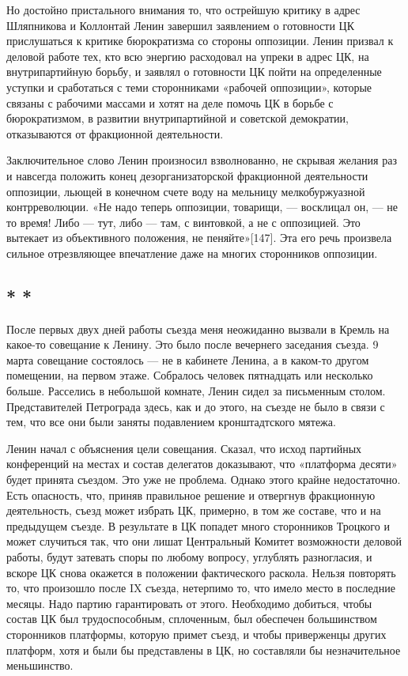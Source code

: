 \documentclass[12pt, a4paper, openany]{book}
\begin{document}
Но достойно пристального внимания то, что острейшую критику в адрес Шляпникова и Коллонтай Ленин завершил заявлением о готовности ЦК прислушаться к критике бюрократизма со стороны оппозиции. Ленин призвал к деловой работе тех, кто всю энергию расходовал на упреки в адрес ЦК, на внутрипартийную борьбу, и заявлял о готовности ЦК пойти на определенные уступки и сработаться с теми сторонниками «рабочей оппозиции», которые связаны с рабочими массами и хотят на деле помочь ЦК в борьбе с бюрократизмом, в развитии внутрипартийной и советской демократии, отказываются от фракционной деятельности.

Заключительное слово Ленин произносил взволнованно, не скрывая желания раз и навсегда положить конец дезорганизаторской фракционной деятельности оппозиции, льющей в конечном счете воду на мельницу мелкобуржуазной контрреволюции. «Не надо теперь оппозиции, товарищи, — восклицал он, — не то время! Либо — тут, либо — там, с винтовкой, а не с оппозицией. Это вытекает из объективного положения, не пеняйте»[147]. Эта его речь произвела сильное отрезвляющее впечатление даже на многих сторонников оппозиции.

\subsection*{\center * * *}

После первых двух дней работы съезда меня неожиданно вызвали в Кремль на какое-то совещание к Ленину. Это было после вечернего заседания съезда. 9 марта совещание состоялось — не в кабинете Ленина, а в каком-то другом помещении, на первом этаже. Собралось человек пятнадцать или несколько больше. Расселись в небольшой комнате, Ленин сидел за письменным столом. Представителей Петрограда здесь, как и до этого, на съезде не было в связи с тем, что все они были заняты подавлением кронштадтского мятежа.

Ленин начал с объяснения цели совещания. Сказал, что исход партийных конференций на местах и состав делегатов доказывают, что «платформа десяти» будет принята съездом. Это уже не проблема. Однако этого крайне недостаточно. Есть опасность, что, приняв правильное решение и отвергнув фракционную деятельность, съезд может избрать ЦК, примерно, в том же составе, что и на предыдущем съезде. В результате в ЦК попадет много сторонников Троцкого и может случиться так, что они лишат Центральный Комитет возможности деловой работы, будут затевать споры по любому вопросу, углублять разногласия, и вскоре ЦК снова окажется в положении фактического раскола. Нельзя повторять то, что произошло после IX съезда, нетерпимо то, что имело место в последние месяцы. Надо партию гарантировать от этого. Необходимо добиться, чтобы состав ЦК был трудоспособным, сплоченным, был обеспечен большинством сторонников платформы, которую примет съезд, и чтобы приверженцы других платформ, хотя и были бы представлены в ЦК, но составляли бы незначительное меньшинство.
\end{document}
